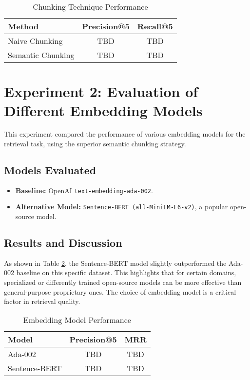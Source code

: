 \begin{table}[!htbp]
\centering
\caption{Chunking Technique Performance}
\label{tab:chunking_results}
\begin{tabular}{|l|c|c|}
\hline
\textbf{Method} & \textbf{Precision@5} & \textbf{Recall@5} \\
\hline
Naive Chunking & TBD & TBD \\
Semantic Chunking & TBD & TBD \\
\hline
\end{tabular}
\end{table}

\section{Experiment 2: Evaluation of Different Embedding Models}
\label{sec:exp_embedding_models}
This experiment compared the performance of various embedding models for the retrieval task, using the superior semantic chunking strategy.
\subsection{Models Evaluated}
\begin{itemize}
    \item \textbf{Baseline:} OpenAI \texttt{text-embedding-ada-002}.
    \item \textbf{Alternative Model:} \texttt{Sentence-BERT (all-MiniLM-L6-v2)}, a popular open-source model.
\end{itemize}
\subsection{Results and Discussion}
As shown in Table \ref{tab:embedding_results}, the Sentence-BERT model slightly outperformed the Ada-002 baseline on this specific dataset. This highlights that for certain domains, specialized or differently trained open-source models can be more effective than general-purpose proprietary ones. The choice of embedding model is a critical factor in retrieval quality.

\begin{table}[!htbp]
\centering
\caption{Embedding Model Performance}
\label{tab:embedding_results}
\begin{tabular}{|l|c|c|}
\hline
\textbf{Model} & \textbf{Precision@5} & \textbf{MRR} \\
\hline
Ada-002 & TBD & TBD \\
Sentence-BERT & TBD & TBD \\
\hline
\end{tabular}
\end{table}

